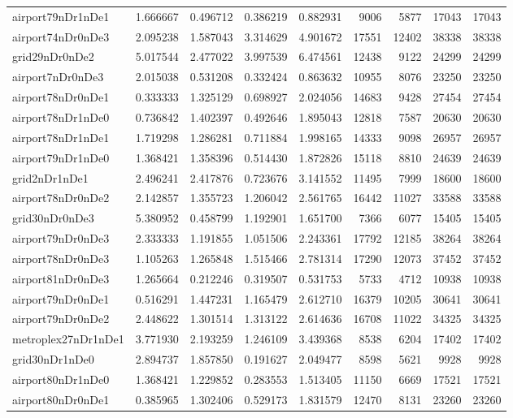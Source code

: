 \begin{longtable}{|l|r|r|r|r|r|r|r|r|}
airport79nDr1nDe1 & 1.666667 & 0.496712 & 0.386219 & 0.882931 & 9006 & 5877 & 17043 & 17043 \\
airport74nDr0nDe3 & 2.095238 & 1.587043 & 3.314629 & 4.901672 & 17551 & 12402 & 38338 & 38338 \\
grid29nDr0nDe2 & 5.017544 & 2.477022 & 3.997539 & 6.474561 & 12438 & 9122 & 24299 & 24299 \\
airport7nDr0nDe3 & 2.015038 & 0.531208 & 0.332424 & 0.863632 & 10955 & 8076 & 23250 & 23250 \\
airport78nDr0nDe1 & 0.333333 & 1.325129 & 0.698927 & 2.024056 & 14683 & 9428 & 27454 & 27454 \\
airport78nDr1nDe0 & 0.736842 & 1.402397 & 0.492646 & 1.895043 & 12818 & 7587 & 20630 & 20630 \\
airport78nDr1nDe1 & 1.719298 & 1.286281 & 0.711884 & 1.998165 & 14333 & 9098 & 26957 & 26957 \\
airport79nDr1nDe0 & 1.368421 & 1.358396 & 0.514430 & 1.872826 & 15118 & 8810 & 24639 & 24639 \\
grid2nDr1nDe1 & 2.496241 & 2.417876 & 0.723676 & 3.141552 & 11495 & 7999 & 18600 & 18600 \\
airport78nDr0nDe2 & 2.142857 & 1.355723 & 1.206042 & 2.561765 & 16442 & 11027 & 33588 & 33588 \\
grid30nDr0nDe3 & 5.380952 & 0.458799 & 1.192901 & 1.651700 & 7366 & 6077 & 15405 & 15405 \\
airport79nDr0nDe3 & 2.333333 & 1.191855 & 1.051506 & 2.243361 & 17792 & 12185 & 38264 & 38264 \\
airport78nDr0nDe3 & 1.105263 & 1.265848 & 1.515466 & 2.781314 & 17290 & 12073 & 37452 & 37452 \\
airport81nDr0nDe3 & 1.265664 & 0.212246 & 0.319507 & 0.531753 & 5733 & 4712 & 10938 & 10938 \\
airport79nDr0nDe1 & 0.516291 & 1.447231 & 1.165479 & 2.612710 & 16379 & 10205 & 30641 & 30641 \\
airport79nDr0nDe2 & 2.448622 & 1.301514 & 1.313122 & 2.614636 & 16708 & 11022 & 34325 & 34325 \\
metroplex27nDr1nDe1 & 3.771930 & 2.193259 & 1.246109 & 3.439368 & 8538 & 6204 & 17402 & 17402 \\
grid30nDr1nDe0 & 2.894737 & 1.857850 & 0.191627 & 2.049477 & 8598 & 5621 & 9928 & 9928 \\
airport80nDr1nDe0 & 1.368421 & 1.229852 & 0.283553 & 1.513405 & 11150 & 6669 & 17521 & 17521 \\
airport80nDr0nDe1 & 0.385965 & 1.302406 & 0.529173 & 1.831579 & 12470 & 8131 & 23260 & 23260 \\

\end{longtable}

